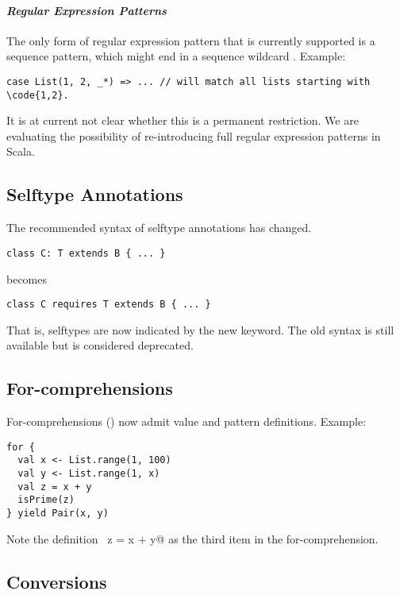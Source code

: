 \paragraph{\em Regular Expression Patterns} The only form of regular
expression pattern that is currently supported is a sequence pattern,
which might end in a sequence wildcard \code{_*}. Example:
\begin{lstlisting}
case List(1, 2, _*) => ... // will match all lists starting with \code{1,2}.
\end{lstlisting}
It is at current not clear whether this is a permanent restriction. We
are evaluating the possibility of re-introducing full regular
expression patterns in Scala.

\subsection*{Selftype Annotations}

The recommended syntax of selftype annotations has changed. 
\begin{lstlisting}
class C: T extends B { ... }
\end{lstlisting}
becomes
\begin{lstlisting}
class C requires T extends B { ... }
\end{lstlisting}
That is, selftypes are now indicated by the new \lstinline@requires@
keyword. The old syntax is still available but is considered deprecated. 

\subsection*{For-comprehensions}

For-comprehensions () now admit value and
pattern definitions. Example:
\begin{lstlisting}
for {
  val x <- List.range(1, 100)
  val y <- List.range(1, x)
  val z = x + y
  isPrime(z)
} yield Pair(x, y)
\end{lstlisting}
Note the definition ~\lstinline@val z = x + y@ as the third item in
the for-comprehension. 

\subsection*{Conversions}

